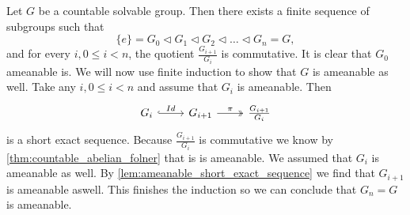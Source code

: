 Let $G$ be a countable solvable group. Then there exists a finite sequence of subgroups such that 
$$\{e\} = G_0 \triangleleft G_1 \triangleleft G_2 \triangleleft \dots \triangleleft G_n = G,$$ and for every $i, 0\le i<n$, the quotient $\frac{G_{i+1}}{G_i}$ is commutative. 
It is clear that $G_0$ ameanable is. We will now use finite induction to show that $G$ is ameanable as well. 
Take any $i, 0\le i<n$ and assume that $G_i$ is ameanable. Then 
\[\begin{tikzcd}
    G_i \arrow[r, "Id", hook] & G_{i+1} \arrow[r, "\pi", two heads] & \frac{G_{i+1}}{G_i}
    \end{tikzcd}\]
is a short exact sequence. Because $\frac{G_{i+1}}{G_i}$ is commutative we know by \cref{thm:countable_abelian_folner} that is is ameanable. We assumed that $G_i$ is ameanable as well. By \cref{lem:ameanable_short_exact_sequence} we find that $G_{i+1}$ is ameanable aswell. This finishes the induction so we can conclude that $G_n = G$ is ameanable.